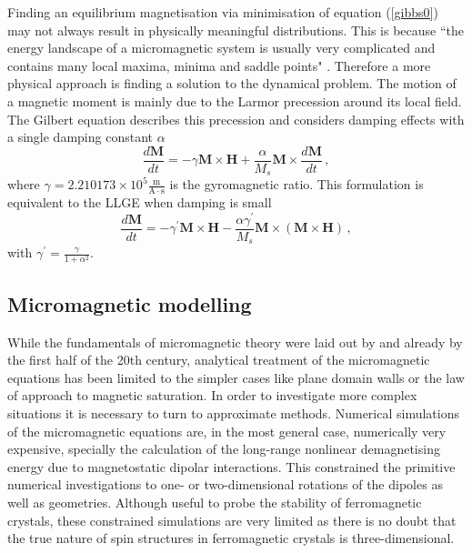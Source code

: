 Finding an equilibrium magnetisation via minimisation of equation (\ref{gibbs0}) may not always result in physically meaningful distributions. This is because ``the energy landscape of a micromagnetic system is usually very complicated and contains many local maxima, minima and saddle points" \citep{ScholzTh}. Therefore a more physical approach is finding a solution to the dynamical problem. The motion of a magnetic moment is mainly due to the Larmor precession around its local field. The Gilbert equation describes this precession and considers damping effects with a single damping constant $\alpha$
\begin{equation}
\frac{d\mathbf{M}}{dt} = -\gamma\mathbf{M}\times\mathbf{H} + \frac{\alpha}{M_s}\mathbf{M}\times\frac{d\mathbf{M}}{dt} \, ,
\end{equation}
where $\gamma = 2.210173 \times 10^5 \frac{\mathrm{m}}{\mathrm{A}\cdot\mathrm{s}}$ is the gyromagnetic ratio.
This formulation is equivalent to the LLGE when damping is small
\begin{equation}
\frac{d\mathbf{M}}{dt} = -\gamma^{'} \mathbf{M}\times\mathbf{H} - \frac{\alpha\gamma^{'}}{M_s} \mathbf{M}\times(\mathbf{M}\times\mathbf{H}) \, ,
\end{equation}
with $\gamma^{'} = \frac{\gamma}{1+\alpha^2}$.

\subsection{Micromagnetic modelling}

While the fundamentals of micromagnetic theory were laid out by \citet{Landau} and \citet{Brown} already by the first half of the 20th century, analytical treatment of the micromagnetic equations has been limited to the simpler cases like plane domain walls or the law of approach to magnetic saturation. In order to investigate more complex situations it is necessary to turn to approximate methods. Numerical simulations of the micromagnetic equations are, in the most general case, numerically very expensive, specially the calculation of the long-range nonlinear demagnetising energy due to magnetostatic dipolar interactions. This constrained the primitive numerical investigations to one- or two-dimensional rotations of the dipoles as well as geometries. Although useful to probe the stability of ferromagnetic crystals, these constrained simulations are very limited as there is no doubt that the true nature of spin structures in ferromagnetic crystals is three-dimensional.\par

